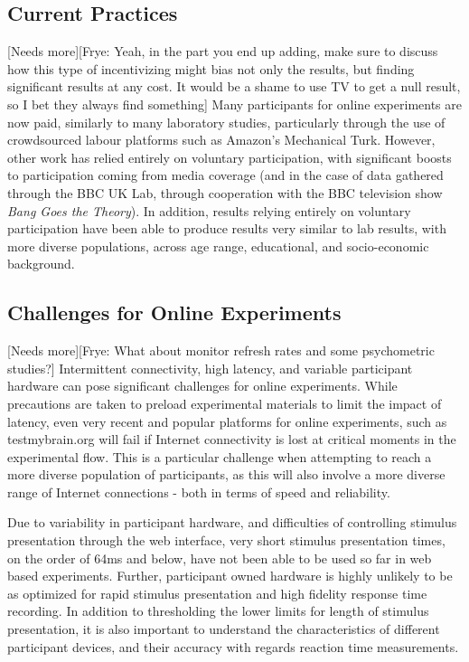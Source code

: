 \documentclass[12pt,a4paper,titlepage]{scrreprt}
\begin{document}
\subsection{Current Practices}
[Needs more][Frye: Yeah, in the part you end up adding, make sure to discuss how this type of incentivizing might bias not only the results, but finding significant results at any cost. It would be a shame to use TV to get a null result, so I bet they always find something]
Many participants for online experiments are now paid, similarly to many laboratory studies, particularly through the use of crowdsourced labour platforms such as Amazon's Mechanical Turk\cite{buhrmester_amazons_2011,rand_promise_2012,crump_evaluating_2013}. However, other work has relied entirely on voluntary participation, with significant boosts to participation coming from media coverage (and in the case of data gathered through the BBC UK Lab, through cooperation with the BBC television show \textit{Bang Goes the Theory})\cite{owen_putting_2010}. In addition, results relying entirely on voluntary participation have been able to produce results very similar to lab results, with more diverse populations, across age range, educational, and socio-economic background\cite{germine_is_2012,halberda_number_2012}.
\subsection{Challenges for Online Experiments}
[Needs more][Frye: What about monitor refresh rates and some psychometric studies?]
Intermittent connectivity, high latency, and variable participant hardware can pose significant challenges for online experiments. While precautions are taken to preload experimental materials to limit the impact of latency, even very recent and popular platforms for online experiments, such as testmybrain.org\cite{germine_is_2012, halberda_number_2012} will fail if Internet connectivity is lost at critical moments in the experimental flow. This is a particular challenge when attempting to reach a more diverse population of participants, as this will also involve a more diverse range of Internet connections - both in terms of speed and reliability.

Due to variability in participant hardware, and difficulties of controlling stimulus presentation through the web interface, very short stimulus presentation times, on the order of 64ms and below, have not been able to be used so far in web based experiments\cite{crump_evaluating_2013}. Further, participant owned hardware is highly unlikely to be as optimized for rapid stimulus presentation and high fidelity response time recording. In addition to thresholding the lower limits for length of stimulus presentation, it is also important to understand the characteristics of different participant devices, and their accuracy with regards reaction time measurements.
\end{document}
